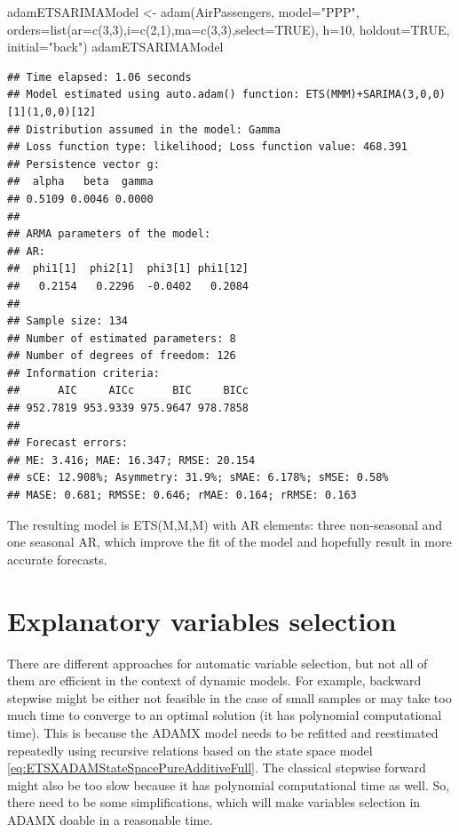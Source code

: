 \documentclass[
]{book}
\newenvironment{Shaded}{\begin{snugshade}}{\end{snugshade}}
\newcommand{\AttributeTok}[1]{\textcolor[rgb]{0.77,0.63,0.00}{#1}}
\newcommand{\ConstantTok}[1]{\textcolor[rgb]{0.00,0.00,0.00}{#1}}
\newcommand{\DecValTok}[1]{\textcolor[rgb]{0.00,0.00,0.81}{#1}}
\newcommand{\FunctionTok}[1]{\textcolor[rgb]{0.00,0.00,0.00}{#1}}
\newcommand{\NormalTok}[1]{#1}
\newcommand{\OtherTok}[1]{\textcolor[rgb]{0.56,0.35,0.01}{#1}}
\newcommand{\StringTok}[1]{\textcolor[rgb]{0.31,0.60,0.02}{#1}}
\theoremstyle{definition}
\theoremstyle{definition}
\theoremstyle{definition}
\theoremstyle{definition}
\theoremstyle{remark}
\begin{document}
\begin{Shaded}
\begin{Highlighting}[]
\NormalTok{adamETSARIMAModel }\OtherTok{\textless{}{-}}
    \FunctionTok{adam}\NormalTok{(AirPassengers, }\AttributeTok{model=}\StringTok{"PPP"}\NormalTok{,}
         \AttributeTok{orders=}\FunctionTok{list}\NormalTok{(}\AttributeTok{ar=}\FunctionTok{c}\NormalTok{(}\DecValTok{3}\NormalTok{,}\DecValTok{3}\NormalTok{),}\AttributeTok{i=}\FunctionTok{c}\NormalTok{(}\DecValTok{2}\NormalTok{,}\DecValTok{1}\NormalTok{),}\AttributeTok{ma=}\FunctionTok{c}\NormalTok{(}\DecValTok{3}\NormalTok{,}\DecValTok{3}\NormalTok{),}\AttributeTok{select=}\ConstantTok{TRUE}\NormalTok{),}
         \AttributeTok{h=}\DecValTok{10}\NormalTok{, }\AttributeTok{holdout=}\ConstantTok{TRUE}\NormalTok{, }\AttributeTok{initial=}\StringTok{"back"}\NormalTok{)}
\NormalTok{adamETSARIMAModel}
\end{Highlighting}
\end{Shaded}

\begin{verbatim}
## Time elapsed: 1.06 seconds
## Model estimated using auto.adam() function: ETS(MMM)+SARIMA(3,0,0)[1](1,0,0)[12]
## Distribution assumed in the model: Gamma
## Loss function type: likelihood; Loss function value: 468.391
## Persistence vector g:
##  alpha   beta  gamma 
## 0.5109 0.0046 0.0000 
## 
## ARMA parameters of the model:
## AR:
##  phi1[1]  phi2[1]  phi3[1] phi1[12] 
##   0.2154   0.2296  -0.0402   0.2084 
## 
## Sample size: 134
## Number of estimated parameters: 8
## Number of degrees of freedom: 126
## Information criteria:
##      AIC     AICc      BIC     BICc 
## 952.7819 953.9339 975.9647 978.7858 
## 
## Forecast errors:
## ME: 3.416; MAE: 16.347; RMSE: 20.154
## sCE: 12.908%; Asymmetry: 31.9%; sMAE: 6.178%; sMSE: 0.58%
## MASE: 0.681; RMSSE: 0.646; rMAE: 0.164; rRMSE: 0.163
\end{verbatim}

The resulting model is ETS(M,M,M) with AR elements: three non-seasonal and one seasonal AR, which improve the fit of the model and hopefully result in more accurate forecasts.

\hypertarget{ETSXSelection}{%
\section{Explanatory variables selection}\label{ETSXSelection}}

There are different approaches for automatic variable selection, but not all of them are efficient in the context of dynamic models. For example, backward stepwise might be either not feasible in the case of small samples or may take too much time to converge to an optimal solution (it has polynomial computational time). This is because the ADAMX model needs to be refitted and reestimated repeatedly using recursive relations based on the state space model \eqref{eq:ETSXADAMStateSpacePureAdditiveFull}. The classical stepwise forward might also be too slow because it has polynomial computational time as well. So, there need to be some simplifications, which will make variables selection in ADAMX doable in a reasonable time.
\end{document}
